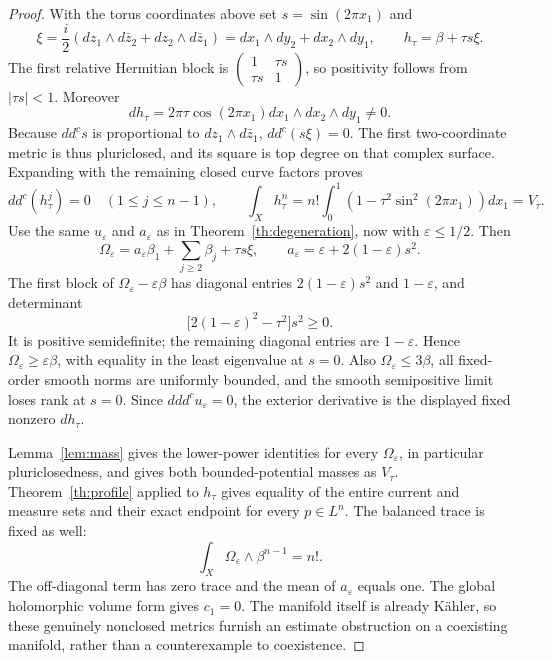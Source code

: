\documentclass[11pt]{article}
\newcommand{\ddc}{dd^c}
\theoremstyle{remark}\newtheorem{remark}[theorem]{Remark}
\begin{document}
\begin{proof}
With the torus coordinates above set $s=\sin(2\pi x_1)$ and
\[
 \xi=\frac i2(dz_1\wedge d\bar z_2+dz_2\wedge d\bar z_1)
      =dx_1\wedge dy_2+dx_2\wedge dy_1,
 \qquad h_\tau=\beta+\tau s\xi.
\]
The first relative Hermitian block is
$\left(\begin{smallmatrix}1&\tau s\\\tau s&1\end{smallmatrix}\right)$,
so positivity follows from $|\tau s|<1$. Moreover
\[
 dh_\tau=2\pi\tau\cos(2\pi x_1)
                   dx_1\wedge dx_2\wedge dy_1\ne0.
\]
Because $\ddc s$ is proportional to $dz_1\wedge d\bar z_1$,
$\ddc(s\xi)=0$. The first two-coordinate metric is thus pluriclosed,
and its square is top degree on that complex surface. Expanding with
the remaining closed curve factors proves
\[
 \ddc(h_\tau^j)=0\quad(1\leq j\leq n-1),\qquad
 \int_X h_\tau^n=n!\int_0^1(1-\tau^2\sin^2(2\pi x_1))dx_1
                   =V_\tau.
\]
Use the same $u_\varepsilon$ and $a_\varepsilon$ as in
Theorem~\ref{th:degeneration}, now with $\varepsilon\leq1/2$. Then
\[
 \Omega_\varepsilon=a_\varepsilon\beta_1+
       \sum_{j\geq2}\beta_j+\tau s\xi,
 \qquad a_\varepsilon=\varepsilon+2(1-\varepsilon)s^2.
\]
The first block of $\Omega_\varepsilon-\varepsilon\beta$ has
diagonal entries $2(1-\varepsilon)s^2$ and $1-\varepsilon$, and
determinant
\[
 \bigl[2(1-\varepsilon)^2-\tau^2\bigr]s^2\geq0.
\]
It is positive semidefinite; the remaining diagonal entries are
$1-\varepsilon$. Hence $\Omega_\varepsilon\geq\varepsilon\beta$,
with equality in the least eigenvalue at $s=0$.
Also $\Omega_\varepsilon\leq3\beta$, all fixed-order smooth norms
are uniformly bounded, and the smooth semipositive limit loses rank
at $s=0$. Since $d\ddc u_\varepsilon=0$, the exterior derivative
is the displayed fixed nonzero $dh_\tau$.

Lemma~\ref{lem:mass} gives the lower-power identities for every
$\Omega_\varepsilon$, in particular pluriclosedness, and gives both
bounded-potential masses as $V_\tau$.
Theorem~\ref{th:profile} applied to $h_\tau$ gives equality of the
entire current and measure sets and their exact endpoint for every
$p\in L^n$. The balanced trace is fixed as well:
\[
 \int_X\Omega_\varepsilon\wedge\beta^{n-1}=n!.
\]
The off-diagonal term has zero trace and the mean of
$a_\varepsilon$ equals one. The global holomorphic volume form gives
$c_1=0$. The manifold itself is already K\"ahler, so these genuinely
nonclosed metrics furnish an estimate obstruction on a coexisting
manifold, rather than a counterexample to coexistence.
\end{proof}
\end{document}
